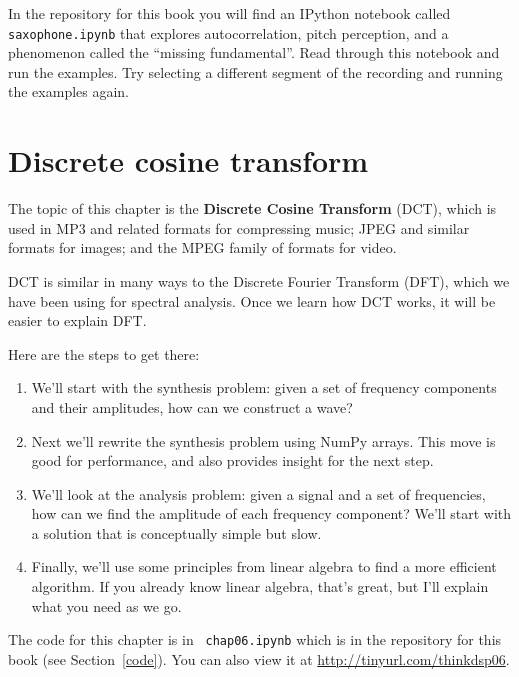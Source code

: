 \documentclass[12pt]{book}
\begin{document}
\begin{exercise}
In the repository for this book you will find an IPython notebook
called \verb"saxophone.ipynb" that explores autocorrelation,
pitch perception, and a phenomenon called the ``missing fundamental''.
Read through this notebook and run the examples.  Try selecting
a different segment of the recording and running the examples again.
\end{exercise}



\chapter{Discrete cosine transform}
\label{dct}

The topic of this chapter is the {\bf Discrete Cosine
  Transform} (DCT), which is used in MP3 and related formats for
compressing music; JPEG and similar formats for images; and the MPEG
family of formats for video.

DCT is similar in many ways to the Discrete Fourier Transform (DFT),
which we have been using for spectral analysis.
Once we learn how DCT works, it will be easier to explain DFT.

Here are the steps to get there:

\begin{enumerate}

\item We'll start with the synthesis problem: given a set of frequency
  components and their amplitudes, how can we construct a wave?

\item Next we'll rewrite the synthesis problem using NumPy arrays.
  This move is good for performance, and also provides insight
  for the next step.

\item We'll look at the analysis problem: given a signal and a
  set of frequencies, how can we find the amplitude of each frequency
  component?  We'll start with a solution that is conceptually simple
  but slow.

\item Finally, we'll use some principles from linear algebra to find a
  more efficient algorithm.  If you already know linear algebra,
  that's great, but I'll explain what you need as we go.

\end{enumerate}

The code for this chapter is in {\tt
  chap06.ipynb} which is in the repository for this book (see
Section~\ref{code}).
You can also view it at \url{http://tinyurl.com/thinkdsp06}.
\end{document}
